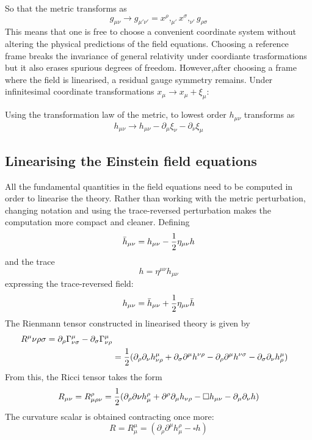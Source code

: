 \documentclass[binding=0.6cm, LaM]{sapthesis}
\begin{document}
So that the metric transforms as 
\begin{equation}
g_{\mu\nu} \rightarrow g_{\mu' \nu'} = x^{\rho},_{\mu'}x^{\sigma},_{\nu'}g_{\rho \sigma}
\end{equation}
This means that one is free to choose a convenient coordinate system without altering the physical predictions of the field equations. 
Choosing a reference frame breaks the invariance of general relativity under coordiante trasformations but it also erases spurious degrees of freedom.
However,after choosing a frame where the field is linearised, a residual gauge symmetry remains. Under infinitesimal coordinate transformations
 $x_{\mu} \rightarrow x_{\mu} + \xi_{\mu}$:

Using the transformation law of the metric, to lowest order $h_{\mu\nu}$ transforms as
\[
h_{\mu\nu} \rightarrow h_{\mu\nu} - \partial_{\mu}\xi_{\nu} - \partial_{\nu}\xi_{\mu}
\]





\subsection{Linearising the Einstein field equations}
All the fundamental quantities in the field equations need to be computed in order to linearise the theory. 
Rather than working with the metric perturbation, changing notation and using the trace-reversed perturbation makes the computation more compact and cleaner. Defining 
\begin{equation}
{\bar h}_{\mu\nu} = h_{\mu\nu} - {1 \over {2}}\eta_{\mu\nu}h  
\end{equation}
and the trace 
\begin{equation}
h = \eta^{\mu\nu}h_{\mu\nu}
\end{equation}
expressing the trace-reversed field:
\begin{equation}
h_{\mu\nu} = {\bar h}_{\mu\nu} + {1 \over {2}}\eta_{\mu\nu}{\bar h}
\end{equation} 
The Rienmann tensor constructed in linearised theory is given by
\begin{align}
R^{\mu}{\nu\rho\sigma} = \partial_{\rho} \Gamma^{\mu}_{\nu\sigma} - \partial_{\sigma}\Gamma^{\mu}_{\nu\rho}  \\
&={ 1 \over 2} (\partial_{\rho}\partial_{\nu}h^{\mu}_{\nu\rho} + \partial_{\sigma}\partial^{\mu}h^{\nu\rho} - \partial_{\rho}\partial^{\mu}h^{\nu\sigma} - \partial_{\sigma}\partial_{\nu}h^{\mu}_{\rho})
\end{align}
From this, the Ricci tensor takes the form
\begin{equation}
R_{\mu\nu} = R^{\rho}_{\mu\rho\nu} = {1 \over 2}(\partial_{\rho}\partial{\nu}h^{\rho}_{\mu} + \partial^{\rho}\partial_{\mu}h_{\nu\rho} - \square h_{\mu\nu} - \partial_{\mu}\partial_{\nu}h)
\end{equation}
The curvature scalar is obtained contracting once more:
\begin{equation}
R = R^{\mu}_{\mu} = (\partial_{\rho}\partial^{\mu}h^{\rho}_{\mu} - \square h)
\end{equation}
\end{document}
